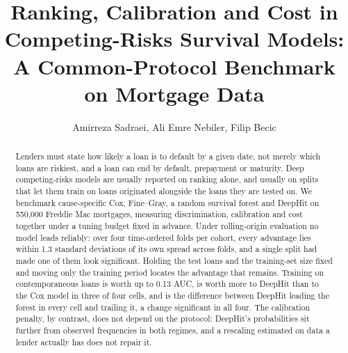 \documentclass[11pt,journal]{IEEEtran}
\begin{document}
\title{Ranking, Calibration and Cost in Competing-Risks Survival Models:\\
A Common-Protocol Benchmark on Mortgage Data}
\author{Amirreza Sadraei, Ali Emre Nebiler, Filip Becic\\
}
\maketitle

\begin{abstract}
Lenders must state how likely a loan is to default by a given date, not merely
which loans are riskiest, and a loan can end by default, prepayment or maturity.
Deep competing-risks models are usually reported on ranking alone, and usually
on splits that let them train on loans originated alongside the loans they are
tested on. We benchmark cause-specific Cox, Fine--Gray, a random survival forest
and DeepHit on 550{,}000 Freddie Mac mortgages, measuring discrimination,
calibration and cost together under a tuning budget fixed in advance. Under
rolling-origin evaluation no model leads reliably: over four time-ordered folds
per cohort, every advantage lies within 1.3 standard deviations of its own
spread across folds, and a single split had made one of them look significant.
Holding the test loans and the training-set size fixed and moving only the
training period locates the advantage that remains. Training on contemporaneous
loans is worth up to 0.13 AUC, is worth more to DeepHit than to the Cox model in
three of four cells, and is the difference between DeepHit leading the forest in
every cell and trailing it, a change significant in all four. The calibration penalty, by contrast, does not depend on
the protocol: DeepHit's probabilities sit further from observed frequencies in
both regimes, and a rescaling estimated on data a lender actually has does not
repair it.
\end{abstract}

\end{document}
